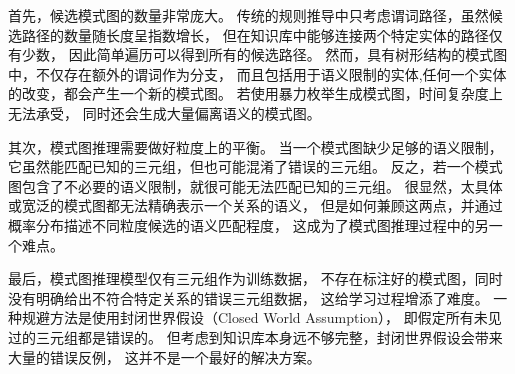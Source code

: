 首先，候选模式图的数量非常庞大。
传统的规则推导中只考虑谓词路径，虽然候选路径的数量随长度呈指数增长，
但在知识库中能够连接两个特定实体的路径仅有少数，
因此简单遍历可以得到所有的候选路径。
然而，具有树形结构的模式图中，不仅存在额外的谓词作为分支，
而且包括用于语义限制的实体,任何一个实体的改变，都会产生一个新的模式图。
若使用暴力枚举生成模式图，时间复杂度上无法承受，
同时还会生成大量偏离语义的模式图。

其次，模式图推理需要做好粒度上的平衡。
当一个模式图缺少足够的语义限制，它虽然能匹配已知的三元组，但也可能混淆了错误的三元组。
反之，若一个模式图包含了不必要的语义限制，就很可能无法匹配已知的三元组。
很显然，太具体或宽泛的模式图都无法精确表示一个关系的语义，
但是如何兼顾这两点，并通过概率分布描述不同粒度候选的语义匹配程度，
这成为了模式图推理过程中的另一个难点。

最后，模式图推理模型仅有三元组作为训练数据，
不存在标注好的模式图，同时没有明确给出不符合特定关系的错误三元组数据，
这给学习过程增添了难度。
一种规避方法是使用封闭世界假设（Closed World Assumption），
即假定所有未见过的三元组都是错误的。
但考虑到知识库本身远不够完整，封闭世界假设会带来大量的错误反例，
这并不是一个最好的解决方案。


%



%
%


